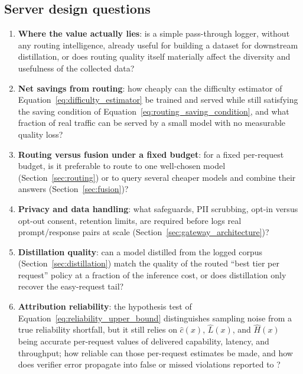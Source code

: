 \subsection{Server design questions}
\label{sec:open_questions_server}

\begin{enumerate}
  \item \textbf{Where the value actually lies}: is a simple pass-through
    logger, without any routing intelligence, already useful for building
    a dataset for downstream distillation, or does routing quality itself
    materially affect the diversity and usefulness of the collected data?

  \item \textbf{Net savings from routing}: how cheaply can the difficulty
    estimator of Equation~\eqref{eq:difficulty_estimator} be trained and
    served while still satisfying the saving condition of
    Equation~\eqref{eq:routing_saving_condition}, and what fraction of
    real traffic can be served by a small model with no measurable
    quality loss?

  \item \textbf{Routing versus fusion under a fixed budget}: for a fixed
    per-request budget, is it preferable to route to one well-chosen
    model (Section~\ref{sec:routing}) or to query several cheaper models
    and combine their answers (Section~\ref{sec:fusion})?

  \item \textbf{Privacy and data handling}: what safeguards, PII
    scrubbing, opt-in versus opt-out consent, retention limits, are
    required before \NoesisServer{} logs real prompt/response pairs at
    scale (Section~\ref{sec:gateway_architecture})?

  \item \textbf{Distillation quality}: can a model distilled from the
    logged corpus (Section~\ref{sec:distillation}) match the quality of
    the routed ``best tier per request'' policy at a fraction of the
    inference cost, or does distillation only recover the easy-request
    tail?

  \item \textbf{Attribution reliability}: the hypothesis test of
    Equation~\eqref{eq:reliability_upper_bound} distinguishes sampling
    noise from a true reliability shortfall, but it still relies on
    $\hat c(x)$, $\hat L(x)$, and $\hat H(x)$ being accurate per-request values
    of delivered capability, latency, and throughput; how reliable can those per-request
    estimates be made, and how does verifier error propagate into false
    or missed violations reported to \NoesisMarket?
\end{enumerate}

